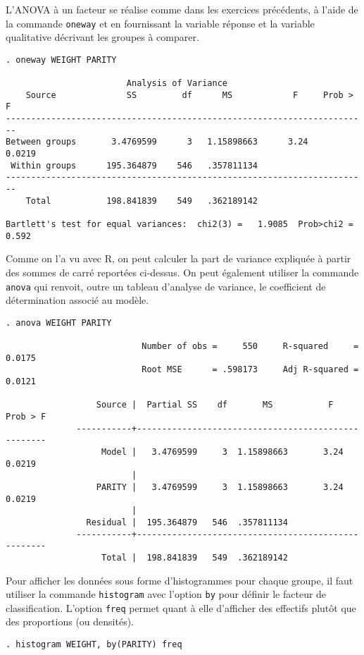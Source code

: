 L'ANOVA à un facteur se réalise comme dans les exercices précédents, à
l'aide de la commande \texttt{oneway} et en fournissant la variable réponse
et la variable qualitative décrivant les groupes à comparer.
\begin{verbatim}
. oneway WEIGHT PARITY

                        Analysis of Variance
    Source              SS         df      MS            F     Prob > F
------------------------------------------------------------------------
Between groups       3.4769599      3   1.15898663      3.24     0.0219
 Within groups      195.364879    546   .357811134
------------------------------------------------------------------------
    Total           198.841839    549   .362189142

Bartlett's test for equal variances:  chi2(3) =   1.9085  Prob>chi2 = 0.592
\end{verbatim}
Comme on l'a vu avec R, on peut calculer la part de variance expliquée à
partir des sommes de carré reportées ci-dessus. On peut également utiliser
la commande \texttt{anova} qui renvoit, outre un tableau d'analyse de
variance, le coefficient de détermination associé au modèle.
\begin{verbatim}
. anova WEIGHT PARITY

                           Number of obs =     550     R-squared     =  0.0175
                           Root MSE      = .598173     Adj R-squared =  0.0121

                  Source |  Partial SS    df       MS           F     Prob > F
              -----------+----------------------------------------------------
                   Model |   3.4769599     3  1.15898663       3.24     0.0219
                         |
                  PARITY |   3.4769599     3  1.15898663       3.24     0.0219
                         |
                Residual |  195.364879   546  .357811134   
              -----------+----------------------------------------------------
                   Total |  198.841839   549  .362189142
\end{verbatim}

Pour afficher les données sous forme d'histogrammes pour chaque groupe, il
faut utiliser la commande \texttt{histogram} avec l'option \texttt{by} pour
définir le facteur de classification. L'option \texttt{freq} permet quant à
elle d'afficher des effectifs plutôt que des proportions (ou densités).
\begin{verbatim}
. histogram WEIGHT, by(PARITY) freq
\end{verbatim}

